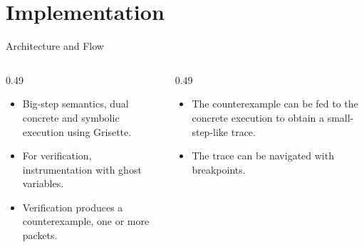 


\section{Implementation}
\begin{frame}{Architecture and Flow}
\centering
{}

\vspace{0.6em}
\begin{columns}[T,onlytextwidth]
  \begin{column}{0.49\textwidth}
    \begin{itemize}\footnotesize\setlength\itemsep{2pt}
    \item Big-step semantics, dual concrete and symbolic execution using Grisette.
    \item For verification, instrumentation with ghost variables.
    \item Verification produces a counterexample, one or more packets.
    \end{itemize}
  \end{column}
  \begin{column}{0.49\textwidth}
    \begin{itemize}\footnotesize\setlength\itemsep{2pt}
    \item The counterexample can be fed to the concrete execution to obtain a small-step-like trace.
    \item The trace can be navigated with breakpoints.
    \end{itemize}
  \end{column}
\end{columns}
\end{frame}




